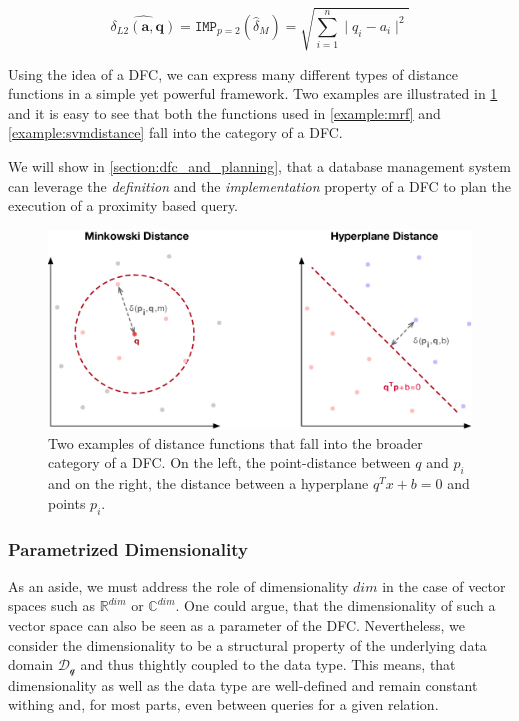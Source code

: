 \begin{equation}
    \hat{\delta_{L2}(\mathbf{a},\mathbf{q})} = \texttt{IMP}_{p=2}(\hat{\delta}_M) = \sqrt{\sum_{i=1}^{n} \mid q_i - a_i \mid^2}
\end{equation}

Using the idea of a DFC, we can express many different types of distance functions in a simple yet powerful framework. Two examples are illustrated in \cref{figure:distance_computation} and it is easy to see that both the functions used in \cref{example:mrf} and \cref{example:svmdistance} fall into the category of a DFC.

We will show in \cref{section:dfc_and_planning}, that a database management system can leverage the \emph{definition} and the \emph{implementation} property of a DFC to plan the execution of a proximity based query.

\begin{figure}[bt]
    \centering
    \includegraphics[width=\textwidth]{figures/distance_computations.eps}
    \caption{Two examples of distance functions that fall into the broader category of a DFC. On the left, the point-distance between $q$ and $p_i$ and on the right, the distance between a hyperplane $q^Tx+b = 0$ and points $p_i$.}
    \label{figure:distance_computation}
\end{figure}

\subsubsection{Parametrized Dimensionality}
As an aside, we must address the role of dimensionality $dim$ in the case of vector spaces such as $\mathbb{R}^{dim}$ or $\mathbb{C}^{dim}$. One could argue, that the dimensionality of such a vector space can also be seen as a parameter of the DFC. Nevertheless, we consider the dimensionality to be a structural property of the underlying data domain $\mathcal{D_q}$ and thus thightly coupled to the data type. This means, that dimensionality as well as the data type are well-defined and remain constant withing and, for most parts, even between queries for a given relation.

